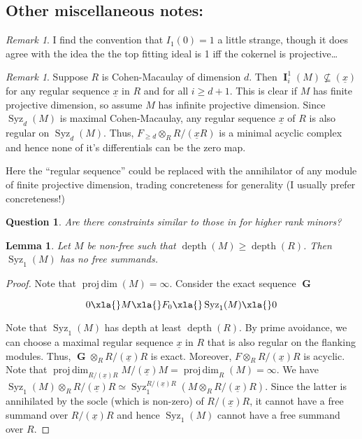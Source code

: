 \documentclass[a4,12pt]{amsart}
\numberwithin{equation}{section}
\newtheorem{lem}[equation]{Lemma}
\newtheorem{question}[equation]{Question}
\theoremstyle{definition}
\theoremstyle{remark}
\newtheorem{rem}[equation]{Remark}
\newcommand{\projdim}{\operatorname{proj\,dim}}
\numberwithin{equation}{section}
\def\depth{\operatorname{depth}}
\def\I{\operatorname{I}}
\def\syz{\Omega}
\def\G{\operatorname{\textbf{G}}}
\def\syz{\operatorname{Syz}}
\def\rk{\operatorname{rank}}
\def\I{\operatorname{\mathbf{I}}}
\def\F{F}
\begin{document}
\subsection*{Other miscellaneous notes:}

\begin{rem}
    I find the convention that $I_1(0) = 1$ a little strange, though it does agree with the idea the the top fitting ideal is 1 iff the cokernel is projective\dots 
\end{rem}
\begin{rem}\label{rem: reg_sequence_ideal_of entries}
    Suppose $R$ is Cohen-Macaulay of dimension $d$. Then $\I^1_i(M)\not\subseteq (\underline{x})$ for any regular sequence $\underline{x}$ in $R$ and for all $i\geq d+1$. This is clear if $M$ has finite projective dimension, so assume $M$ has infinite projective dimension. Since $\syz_d(M)$ is maximal Cohen-Macaulay, any regular sequence $\underline{x}$ of $R$ is also regular on $\syz_d(M)$. Thus, $\F_{\geq d}\otimes_R R/(\underline{x}R)$ is a minimal acyclic complex and hence none of it's differentials can be the zero map.

    Here the ``regular sequence'' could be replaced with the annihilator of any module of finite projective dimension, trading concreteness for generality (I usually prefer concreteness!)
\end{rem}

\begin{question}
    Are there constraints similar to those in  for higher rank minors?
\end{question}

 \begin{lem}\label{lem: no_free_summands}
     Let $M$ be non-free such that $\depth(M)\geq \depth(R)$. Then $\syz_1(M)$ has no free summands.
 \end{lem}
 \begin{proof}
     Note that $\projdim(M)=\infty$. Consider the exact sequence $\G$
     
$$
  0 \xla{}  M \xla{} F_0 \xla{} \syz_1(M) \xla{} 0
 $$


 Note that $\syz_1(M)$ has depth at least $\depth(R)$. By prime avoidance, we can choose a maximal regular sequence $\underline{x}$ in $R$ that is also regular on the flanking modules. Thus, $\G\otimes_R R/(\underline{x})R$ is exact. Moreover, $\F\otimes_R R/(\underline{x})R$ is acyclic. Note that $\projdim_{R/(\underline{x})R}M/(\underline{x})M = \projdim_R(M)=\infty$. We have $\syz_1(M)\otimes_R R/(\underline{x})R\simeq \syz_1^{R/(\underline{x})R}(M\otimes_R R/(\underline{x})R)$. Since the latter is annihilated by the socle (which is non-zero) of $R/(\underline{x})R$, it cannot have a free summand over $R/(\underline{x})R$ and hence $\syz_1(M)$ cannot have a free summand over $R$.
 

 \end{proof}
\end{document}
